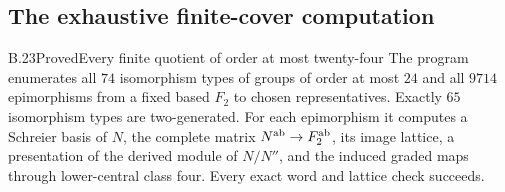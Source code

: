 \subsection{The exhaustive finite-cover computation}

\begin{statement}{B.23}{Proved}{Every finite quotient of order at most twenty-four}
The program enumerates all $74$ isomorphism types of groups
of order at most $24$ and all $9714$ epimorphisms from a
fixed based $F_2$ to chosen representatives. Exactly $65$
isomorphism types are two-generated. For each epimorphism
it computes a Schreier basis of $N$, the complete matrix
$N^{\mathrm{ab}}\to F_2^{\mathrm{ab}}$, its image lattice, a presentation of
the derived module of $N/N''$, and the induced graded maps
through lower-central class four. Every exact word and
lattice check succeeds.
\end{statement}
